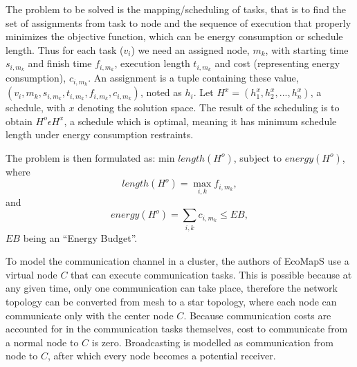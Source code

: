 The problem to be solved is the mapping/scheduling of tasks, that is to find the set of assignments from task to node and the sequence
of execution that properly minimizes the objective function, which can be energy consumption or schedule length. Thus for each task 
($v_i$) we need an assigned node, $m_k$, with starting time $s_{i,m_k}$ and finish time $f_{i,m_k}$, execution length $t_{i,m_k}$ and
cost (representing energy consumption), $c_{i,m_k}$. An assignment is a tuple containing these value, 
$(v_i, m_k, s_{i,m_k}, t_{i,m_k}, f_{i,m_k}, c_{i,m_k})$, noted as $h_i$. Let $H^x = (h_1^x,h_2^x, ..., h_n^x)$, a schedule, with 
$x$ denoting the solution space. The result of the scheduling is to obtain $H^o \epsilon {H^x}$, a schedule which is optimal, meaning
it has minimum schedule length under energy consumption restraints. 

The problem is then formulated as: min $length(H^o)$, subject to $energy(H^o)$, where 
\[ length(H^o) = \max_{i,k} f_{i,m_k},\]
and
\[ energy(H^o) = \sum_{i,k} c_{i,m_k} \leq EB,\]
$EB$ being an ``Energy Budget''.

To model the communication channel in a cluster, the authors of EcoMapS use a virtual node $C$ that can execute communication tasks.
This is possible because at any given time, only one communication can take place, therefore the network topology can be converted from 
mesh to a star topology, where each node can communicate only with the center node $C$. Because communication costs are accounted for 
in the communication tasks themselves, cost to communicate from a normal node to $C$ is zero. Broadcasting is modelled as communication
from node to $C$, after which every node becomes a potential receiver.

